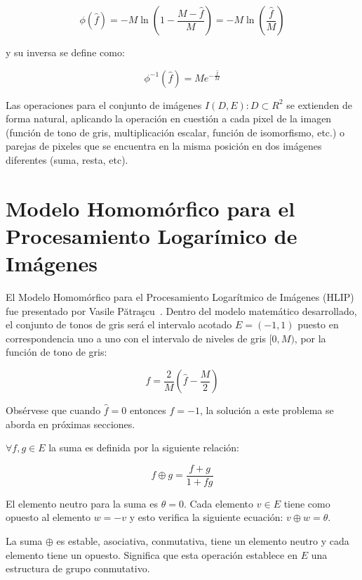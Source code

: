 \begin{equation}
	\phi(\hat{f}) = -M\ln\left(1-\frac{M-\hat{f}}{M}\right) = -M\ln\left(\frac{\hat{f}}{M}\right)
\end{equation}

y su inversa se define como:

\begin{equation}
	\phi^{-1}(\hat{f}) = Me^{-\frac{\hat{f}}{M}} 
\end{equation}

Las operaciones para el conjunto de im\'agenes $I(D,E):D\subset R^2$ se extienden de forma natural, aplicando la operaci\'on en cuesti\'on a cada pixel de la imagen (funci\'on de tono de gris, multiplicaci\'on escalar, funci\'on de isomorfismo, etc.) o parejas de pixeles que se encuentra en la misma posici\'on en dos im\'agenes diferentes (suma, resta, etc). 

\section{Modelo Homom\'orfico para el Procesamiento Logar\'imico de Im\'agenes}

El Modelo Homom\'orfico para el Procesamiento Logar\'itmico de Im\'agenes (HLIP) fue presentado por Vasile Pătraşcu~\cite{patrascu2014mathematical}. Dentro del modelo matemático desarrollado, el conjunto de tonos de gris será el intervalo acotado $E = (-1, 1)$ puesto en correspondencia uno a uno con el intervalo de niveles de gris $[0,M)$, por la funci\'on de tono de gris:

\begin{equation}
	f=\frac{2}{M}\left(\hat{f}-\frac{M}{2}\right)
\end{equation}

Obs\'ervese que cuando $\hat{f}=0$ entonces $f=-1$, la soluci\'on a este problema se aborda en pr\'oximas secciones.

$\forall f,g \in E$ la suma es definida por la siguiente relaci\'on:

\begin{equation}
	f \oplus g=\frac{f+g}{1+fg}
\end{equation}

El elemento neutro para la suma es $\theta = 0$. Cada elemento $v \in E$ tiene como opuesto al elemento $w = - v$ y esto verifica la siguiente ecuación: $v \oplus w = \theta$.

La suma $\oplus$ es estable, asociativa, conmutativa, tiene un elemento neutro y cada elemento tiene un opuesto. Significa que esta operación establece en $E$ una estructura de grupo conmutativo.

